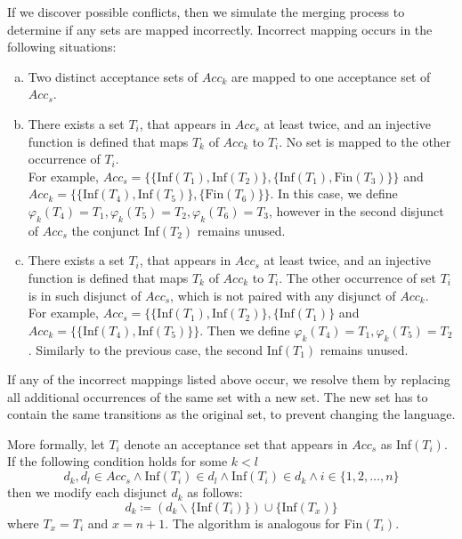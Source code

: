 \documentclass[
  digital, %
  twoside, %
  table,   %
  lof,     %
  lot,     %
]{fithesis3}
\begin{document}
If we discover possible conflicts, then we simulate the merging process to determine if any sets are mapped incorrectly. Incorrect mapping occurs in the following situations:
\begin{enumerate}[a)]
  \item Two distinct acceptance sets of $Acc_k$ are mapped to one acceptance set of $Acc_s$.
  \item There exists a set $T_i$, that appears in $Acc_s$ at least twice, and an injective function is defined that maps $T_k$ of $Acc_k$ to $T_i$. No set is mapped to the other occurrence of $T_i$. \\
  For example, $Acc_s = \{\{\text{Inf}(T_1), \text{Inf}(T_2)\}, \{\text{Inf}(T_1), \text{Fin}(T_3)\}\}$ and $Acc_k = \{\{\text{Inf}(T_4), \text{Inf}(T_5)\}, \{\text{Fin}(T_6)\}\}$. In this case, we define $\varphi_k (T_4) = T_1, \varphi_k (T_5) = T_2, \varphi_k (T_6) = T_3$, however in the second disjunct of $Acc_s$ the conjunct Inf$(T_2)$ remains unused.
  \item There exists a set $T_i$, that appears in $Acc_s$ at least twice, and an injective function is defined that maps $T_k$ of $Acc_k$ to $T_i$. The other occurrence of set $T_i$ is in such disjunct of $Acc_s$, which is not paired with any disjunct of $Acc_k$. \\
  For example, $Acc_s = \{\{\text{Inf}(T_1), \text{Inf}(T_2)\}, \{\text{Inf}(T_1)\}$ and $Acc_k = \{\{\text{Inf}(T_4), \text{Inf}(T_5)\}\}$. Then we define $\varphi_k (T_4) = T_1, \varphi_k (T_5) = T_2$. Similarly to the previous case, the second Inf$(T_1)$ remains unused. 
\end{enumerate}

If any of the incorrect mappings listed above occur, we resolve them by replacing all additional occurrences of the same set with a new set. The new set has to contain the same transitions as the original set, to prevent changing the language. 

More formally, let $T_i$ denote an acceptance set that appears in $Acc_s$ as Inf$(T_i)$. If the following condition holds for some $k < l$
\begin{equation*}
  d_k, d_l \in Acc_s \wedge \text{Inf}(T_i) \in d_l \wedge \text{Inf}(T_i) \in d_k \wedge i \in \{1, 2, \dots, n\}
\end{equation*}
then we modify each disjunct $d_k$ as follows:
\begin{equation*}
  d_k \coloneqq (d_k \smallsetminus \{\text{Inf}(T_i)\}) \cup \{\text{Inf}(T_x)\}
\end{equation*}
where $T_x = T_i$ and $x = n + 1$. The algorithm is analogous for Fin$(T_i)$.
\end{document}
